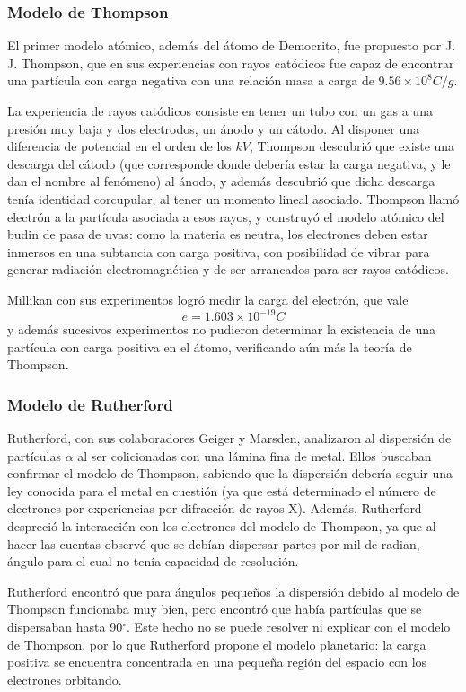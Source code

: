 \subsubsection{Modelo de Thompson}
El primer modelo atómico, además del átomo de Democrito, fue propuesto por J. J. Thompson, que en sus experiencias con rayos catódicos fue capaz de encontrar una partícula con carga negativa con una relación masa a carga de $9.56 \times 10^8 C/g$.

La experiencia de rayos catódicos consiste en tener un tubo con un gas a una presión muy baja y dos electrodos, un ánodo y un cátodo.
Al disponer una diferencia de potencial en el orden de los $kV$, Thompson descubrió que existe una descarga del cátodo (que corresponde donde debería estar la carga negativa, y le dan el nombre al fenómeno) al ánodo, y además descubrió que dicha descarga tenía identidad corcupular, al tener un momento lineal asociado. 
Thompson llamó electrón a la partícula asociada a esos rayos, y construyó el modelo atómico del budin de pasa de uvas: como la materia es neutra, los electrones deben estar inmersos en una subtancia con carga positiva, con posibilidad de vibrar para generar radiación electromagnética y de ser arrancados para ser rayos catódicos.

Millikan con sus experimentos logró medir la carga del electrón, que vale 
\begin{equation}
 e = 1.603 \times 10^{-19} C
\end{equation}
y además sucesivos experimentos no pudieron determinar la existencia de una partícula con carga positiva en el átomo, verificando aún más la teoría de Thompson.

\subsubsection{Modelo de Rutherford}
Rutherford, con sus colaboradores Geiger y Marsden, analizaron al dispersión de partículas $\alpha$ al ser colicionadas con una lámina fina de metal.
Ellos buscaban confirmar el modelo de Thompson, sabiendo que la dispersión debería seguir una ley conocida para el metal en cuestión (ya que está determinado el número de electrones por experiencias por difracción de rayos X).
Además, Rutherford despreció la interacción con los electrones del modelo de Thompson, ya que al hacer las cuentas observó que se debían dispersar partes por mil de radian, ángulo para el cual no tenía capacidad de resolución.

Rutherford encontró que para ángulos pequeños la dispersión debido al modelo de Thompson funcionaba muy bien, pero encontró que había partículas que se dispersaban hasta 90$^\circ$.
Este hecho no se puede resolver ni explicar con el modelo de Thompson, por lo que Rutherford propone el modelo planetario: la carga positiva se encuentra concentrada en una pequeña región del espacio con los electrones orbitando.

